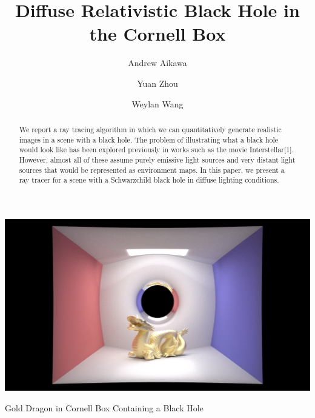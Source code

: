 \documentclass[sigconf]{acmart}
\begin{document}
%
\title{Diffuse Relativistic Black Hole in the Cornell Box}

%
\author{Andrew Aikawa}

\author{Yuan Zhou}

\author{Weylan Wang}

\begin{abstract}
We report a ray tracing algorithm in which we can quantitatively generate realistic images in a scene with a black hole.  The problem of illustrating what a black hole would look like has been explored previously in works such as the movie Interstellar[1]. However, almost all of these assume purely emissive light sources and very distant light sources that would be represented as environment maps.  In this paper, we present a ray tracer for a scene with a Schwarzchild black hole in diffuse lighting conditions.
\end{abstract}


%

%
\begin{teaserfigure}
  \includegraphics[width=\textwidth]{dragon.png}
  \caption{Gold Dragon in Cornell Box Containing a Black Hole}
  \label{fig:teaser}
\end{teaserfigure}
\end{document}
